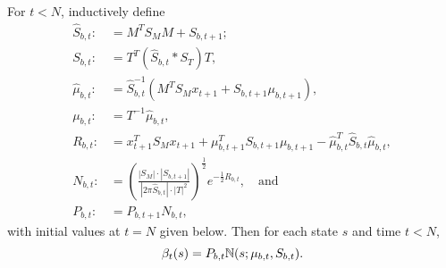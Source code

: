 \documentclass[12pt,leqno]{article}
\begin{document}
\begin{Thm}\label{beta:1}
  For $t < N$, inductively define
\begin{align*}
  \hat{S}_{b,t} :&= M^TS_MM + S_{b,t+1};\\
  S_{b,t} :&= T^T(\hat{S}_{b,t}*S_T)T,\\
  \hat{\mu}_{b,t} :&= \hat{S}_{b,t}^{-1}(M^TS_Mx_{t+1} + S_{b,t+1}\mu_{b,t+1}),\\
  \mu_{b,t} :&= T^{-1}\hat{\mu}_{b,t},\\
  R_{b,t} :&= x_{t+1}^TS_Mx_{t+1} + \mu_{b,t+1}^TS_{b,t+1}\mu_{b,t+1} - \hat{\mu}_{b,t}^T\hat{S}_{b,t}\hat{\mu}_{b,t},\\
  N_{b,t} :&= \left(\frac{|S_M|\cdot|S_{b,t+1}|}{|2\pi\hat{S}_{b,t}|\cdot|T|^2}\right)^{\frac{1}{2}}e^{-\frac{1}{2}R_{b,t}},\quad\text{and}\\
  P_{b,t}:&=P_{b,t+1}N_{b,t},
\end{align*}
with initial values at $t = N$ given below. Then for each state $s$ and time $t < N$,
$$
  \beta_t(s) = P_{b,t}{\mathbb N}(s;\mu_{b,t},S_{b,t}).
$$
\end{Thm}
\end{document}
